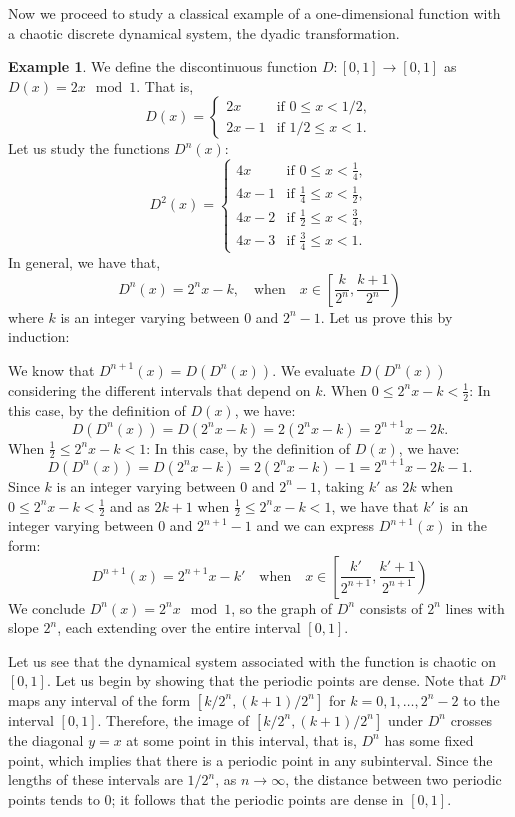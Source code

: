 \documentclass[12pt,a4paper]{report}
\theoremstyle{definition}
\newtheorem{ejemplo}{Example}[section]
\begin{document}
Now we proceed to study a classical example of a one-dimensional function with a chaotic discrete dynamical system, the dyadic transformation.

\begin{ejemplo}
 
We define the discontinuous function $ D: [0, 1] \to [0, 1] $ as $ D(x) = 2x \mod 1 $. That is,
\[
D(x) =
\begin{cases}
2x & \text{if } 0 \leq x < 1/2, \\
2x - 1 & \text{if } 1/2 \leq x < 1.
\end{cases}
\]
%
Let us study the functions $D^n(x)$:
\[
D^2(x) = 
\begin{cases} 
4x & \text{if } 0 \leq x < \frac{1}{4}, \\
4x - 1 & \text{if } \frac{1}{4} \leq x < \frac{1}{2}, \\
4x - 2 & \text{if } \frac{1}{2} \leq x < \frac{3}{4}, \\
4x - 3 & \text{if } \frac{3}{4} \leq x < 1.
\end{cases}
\]
%
In general, we have that, 
\[
D^n(x) = 2^n x - k, \quad \text{when} \quad x \in \left [\frac{k}{2^n},\frac{k+1}{2^n} \right )
\]
%
where \( k \) is an integer varying between $0$ and $2^n - 1$.
Let us prove this by induction:

We know that \( D^{n+1}(x) = D(D^n(x)) \). We evaluate \( D(D^n(x)) \) considering the different intervals that depend on \( k \).
\newline
When  \( 0 \leq 2^n x - k < \frac{1}{2} \):
In this case, by the definition of \( D(x) \), we have:
\[
D(D^n(x)) = D(2^n x - k) = 2(2^n x - k) = 2^{n+1} x - 2k.
\]
%
When  \( \frac{1}{2} \leq 2^n x - k < 1 \):
In this case, by the definition of \( D(x) \), we have:
\[
D(D^n(x)) = D(2^n x - k) = 2(2^n x - k) - 1 = 2^{n+1} x - 2k - 1.
\]
%
Since $k$ is an integer varying between $0$ and $2^n-1$, taking $k'$ as $2k$ when \( 0 \leq 2^n x - k < \frac{1}{2} \) and as $2k+1$ when \( \frac{1}{2} \leq 2^n x - k < 1 \), we have that $k'$ is an integer varying between $0$ and $2^{n+1}-1$ and we can express \( D^{n+1}(x) \) in the form:
\[
D^{n+1}(x) = 2^{n+1} x - k' \quad \text{when} \quad x \in \left [\frac{k'}{2^{n+1}},\frac{k'+1}{2^{n+1}} \right )
\]
%
We conclude $ D^n(x) = 2^n x \mod 1 $, so the graph of $ D^n $ consists of $ 2^n $ lines with slope $ 2^n $, each extending over the entire interval $[0,1]$.

Let us see that the dynamical system associated with the function is chaotic on $[0,1]$.
Let us begin by showing that the periodic points are dense. Note that $ D^n $ maps any interval of the form $[k/2^n, (k+1)/2^n]$ for $ k = 0, 1, \dots, 2^n - 2 $ to the interval $[0,1]$. Therefore, the image of $[k/2^n, (k+1)/2^n]$ under $ D^n $ crosses the diagonal $ y = x $ at some point in this interval, that is, $D^n$ has some fixed point, which implies that there is a periodic point in any subinterval. Since the lengths of these intervals are $ 1/2^n $, as $n \to \infty$, the distance between two periodic points tends to $0$; it follows that the periodic points are dense in $[0,1]$.


\end{ejemplo}
\end{document}
